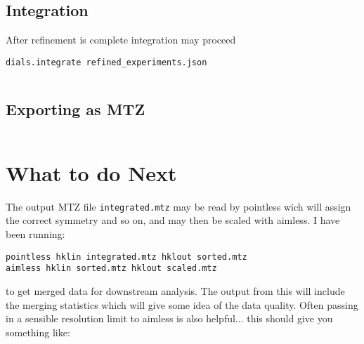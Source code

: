 \documentclass[a4paper, 11pt]{article}
\begin{document}
\subsection{Integration}

After refinement is complete integration may proceed

{\small
\begin{verbatim}
dials.integrate refined_experiments.json 
\end{verbatim}
}

{\small
\begin{verbatim}

\end{verbatim}
}

\subsection{Exporting as MTZ}

{\small
\begin{verbatim}
\end{verbatim}
}

\section{What to do Next}

The output MTZ file \verb|integrated.mtz| may be read by pointless wich will assign the correct symmetry and so on, and may then be scaled with aimless. I have been running:

{\small
\begin{verbatim}
pointless hklin integrated.mtz hklout sorted.mtz
aimless hklin sorted.mtz hklout scaled.mtz
\end{verbatim}
}

\noindent
to get merged data for downstream analysis. The output from this will
include the merging statistics which will give some idea of the data
quality. Often passing in a sensible resolution limit to aimless is
also helpful... this should give you something like:
\end{document}
